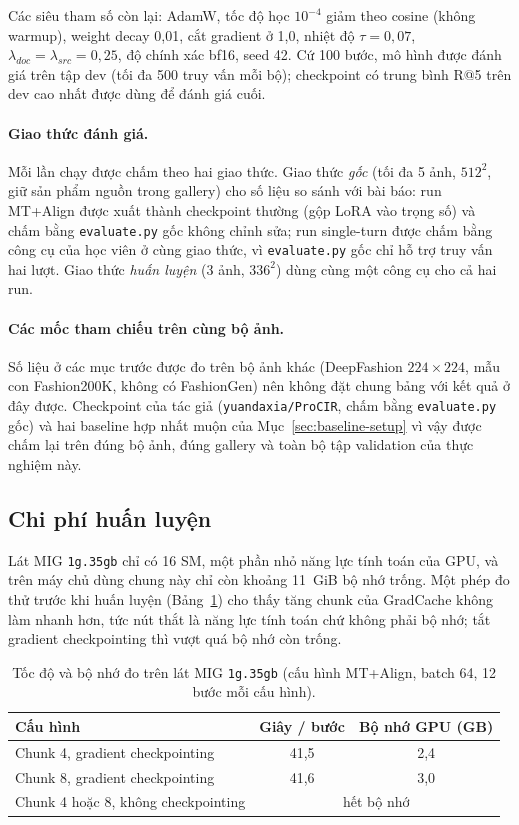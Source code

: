 Các siêu tham số còn lại: AdamW, tốc độ học $10^{-4}$ giảm theo cosine (không warmup), weight decay 0,01, cắt gradient ở 1,0, nhiệt độ $\tau = 0{,}07$, $\lambda_{doc} = \lambda_{src} = 0{,}25$, độ chính xác bf16, seed 42. Cứ 100 bước, mô hình được đánh giá trên tập dev (tối đa 500 truy vấn mỗi bộ); checkpoint có trung bình R@5 trên dev cao nhất được dùng để đánh giá cuối.

\paragraph{Giao thức đánh giá.} Mỗi lần chạy được chấm theo hai giao thức. Giao thức \emph{gốc} (tối đa 5 ảnh, $512^2$, giữ sản phẩm nguồn trong gallery) cho số liệu so sánh với bài báo: run MT+Align được xuất thành checkpoint thường (gộp LoRA vào trọng số) và chấm bằng \texttt{evaluate.py} gốc không chỉnh sửa; run single-turn được chấm bằng công cụ của học viên ở cùng giao thức, vì \texttt{evaluate.py} gốc chỉ hỗ trợ truy vấn hai lượt. Giao thức \emph{huấn luyện} (3 ảnh, $336^2$) dùng cùng một công cụ cho cả hai run.

\paragraph{Các mốc tham chiếu trên cùng bộ ảnh.} Số liệu ở các mục trước được đo trên bộ ảnh khác (DeepFashion $224 \times 224$, mẫu con Fashion200K, không có FashionGen) nên không đặt chung bảng với kết quả ở đây được. Checkpoint của tác giả (\texttt{yuandaxia/ProCIR}, chấm bằng \texttt{evaluate.py} gốc) và hai baseline hợp nhất muộn của Mục~\ref{sec:baseline-setup} vì vậy được chấm lại trên đúng bộ ảnh, đúng gallery và toàn bộ tập validation của thực nghiệm này.

\subsection{Chi phí huấn luyện}

Lát MIG \texttt{1g.35gb} chỉ có 16 SM, một phần nhỏ năng lực tính toán của GPU, và trên máy chủ dùng chung này chỉ còn khoảng 11~GiB bộ nhớ trống. Một phép đo thử trước khi huấn luyện (Bảng~\ref{tab:train-cost}) cho thấy tăng chunk của GradCache không làm nhanh hơn, tức nút thắt là năng lực tính toán chứ không phải bộ nhớ; tắt gradient checkpointing thì vượt quá bộ nhớ còn trống.

\begin{table}[h]
\centering
\caption{Tốc độ và bộ nhớ đo trên lát MIG \texttt{1g.35gb} (cấu hình MT+Align, batch 64, 12 bước mỗi cấu hình).}
\label{tab:train-cost}
\small
\begin{tabular}{lcc}
\toprule
Cấu hình & Giây / bước & Bộ nhớ GPU (GB) \\
\midrule
Chunk 4, gradient checkpointing & 41,5 & 2,4 \\
Chunk 8, gradient checkpointing & 41,6 & 3,0 \\
Chunk 4 hoặc 8, không checkpointing & \multicolumn{2}{c}{hết bộ nhớ} \\
\bottomrule
\end{tabular}
\end{table}

